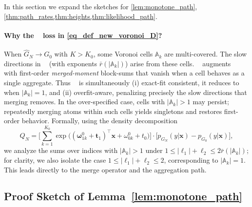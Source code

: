 \documentclass[twoside]{article}
\DeclareMathOperator*{\VDFRA}{D_{FRA}}
\DeclareMathOperator*{\VDO}{D_{O}}
\DeclareMathOperator*{\VDE}{D_{E}}
\theoremstyle{plain}
\theoremstyle{definition}
\theoremstyle{plain}
\def\vomega{{\bm{\omega}}}
\def\vell{{\bm{\ell}}}
\def\vt{{\bm{t}}}
\def\vx{{\bm{x}}}
\def\sA{{\mathbb{A}}}
\begin{document}
In this section we expand the sketches for
\cref{lem:monotone_path}, \cref{thm:path_rates,thm:heights,thm:likelihood_path}.

\paragraph{Why the \texorpdfstring{\(\VDFRA\)}{VDFRA} loss in \cref{eq_def_new_voronoi_D}?}
When \(\widehat G_N \to G_0\) with \(K > K_0\), some Voronoi cells \(\sA_k\) are multi-covered. The slow directions in \(\VDO\) (with exponents \(\bar r(|\sA_k|)\)) arise from these cells. \(\VDFRA\) augments \(\VDO\) with first-order \emph{merged-moment} block-sums that vanish when a cell behaves as a single aggregate. Thus \(\VDFRA\) is simultaneously (i) exact-fit consistent, it reduces to \(\VDE\) when \(|\sA_k|=1\), and (ii) overfit-aware, penalizing precisely the slow directions that merging removes. In the over-specified case, cells with \(|\sA_k|>1\) may persist; repeatedly merging atoms within such cells yields singletons and restores first-order behavior. Formally, using the density decomposition
\[
Q_{N}=\Big[\sum_{k=1}^{K_{0}} \exp \big((\vomega_{1 k}^{0}+\vt_1)^{\top} \vx+\omega_{0 k}^{0}+t_{0}\big)\Big]\cdot\big[p_{G_{N}}(y|\vx)-p_{G_{0}}(y|\vx)\big],
\]
we analyze the sums over indices with \(|\sA_k|>1\) under \(1 \le |\vell_1|+\ell_2 \le 2\bar r(|\sA_k|)\); for clarity, we also isolate the case \(1 \le |\vell_1|+\ell_2 \le 2\), corresponding to \(|\sA_k|=1\). This leads directly to the merge operator and the aggregation path.



\subsection{Proof Sketch of Lemma~\ref{lem:monotone_path}}
\end{document}
